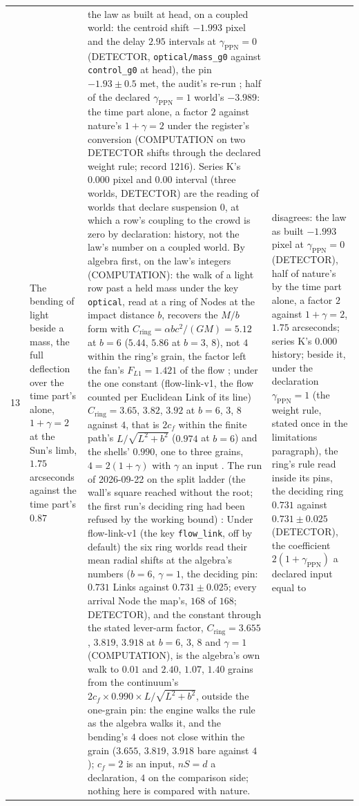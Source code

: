 {\begin{longtable}{L{0.3in}L{2.0in}L{1.5in}L{2.2in}}
13 & The bending of light beside a mass, the full deflection over the time part's alone, $1 + \gamma = 2$ at the Sun's limb, $1.75$ arcseconds against the time part's $0.87$ \cite{dyson1920} & the law as built at head, on a coupled world: the centroid shift $-1.993$ pixel and the delay $2.95$ intervals at $\gamma_{\mathrm{PPN}} = 0$ (DETECTOR, \texttt{optical/mass\_g0} against \texttt{control\_g0} at head), the pin $-1.93 \pm 0.5$ met, the audit's re-run \cite{disagrees}; half of the declared $\gamma_{\mathrm{PPN}} = 1$ world's $-3.989$: the time part alone, a factor $2$ against nature's $1 + \gamma = 2$ under the register's conversion (COMPUTATION on two DETECTOR shifts through the declared weight rule; record 1216). Series K's $0.000$ pixel and $0.00$ interval (three worlds, DETECTOR) are the reading of worlds that declare suspension $0$, at which a row's coupling to the crowd is zero by declaration: history, not the law's number on a coupled world. By algebra first, on the law's integers (COMPUTATION): the walk of a light row past a held mass under the key \texttt{optical}, read at a ring of Nodes at the impact distance $b$, recovers the $M/b$ form with $C_{\mathrm{ring}} = \alpha b c^2/(GM) = 5.12$ at $b = 6$ ($5.44$, $5.86$ at $b = 3$, $8$), not $4$ within the ring's grain, the factor left the fan's $F_{L1} = 1.421$ of the flow \cite{stepalgebra}; under the one constant (flow-link-v1, the flow counted per Euclidean Link of its line) $C_{\mathrm{ring}} = 3.65$, $3.82$, $3.92$ at $b = 6$, $3$, $8$ against $4$, that is $2c_f$ within the finite path's $L/\sqrt{L^2 + b^2}$ ($0.974$ at $b = 6$) and the shells' $0.990$, one to three grains, $4 = 2(1 + \gamma)$ with $\gamma$ an input \cite{flowalgebra}. The run of 2026-09-22 on the split ladder (the wall's square reached without the root; the first run's deciding ring had been refused by the working bound) \cite{ringrun}: Under flow-link-v1 (the key \texttt{flow\_link}, off by default) the six ring worlds read their mean radial shifts at the algebra's numbers ($b = 6$, $\gamma = 1$, the deciding pin: $0.731$ Links against $0.731 \pm 0.025$; every arrival Node the map's, $168$ of $168$; DETECTOR), and the constant through the stated lever-arm factor, $C_{\mathrm{ring}} = 3.655$, $3.819$, $3.918$ at $b = 6$, $3$, $8$ and $\gamma = 1$ (COMPUTATION), is the algebra's own walk to $0.01$ and $2.40$, $1.07$, $1.40$ grains from the continuum's $2c_f \times 0.990 \times L/\sqrt{L^2 + b^2}$, outside the one-grain pin: the engine walks the rule as the algebra walks it, and the bending's $4$ does not close within the grain ($3.655$, $3.819$, $3.918$ bare against $4$); $c_f = 2$ is an input, $nS = d$ a declaration, $4$ on the comparison side; nothing here is compared with nature. & disagrees: the law as built $-1.993$ pixel at $\gamma_{\mathrm{PPN}} = 0$ (DETECTOR), half of nature's by the time part alone, a factor $2$ against $1 + \gamma = 2$, $1.75$ arcseconds; series K's $0.000$ history; beside it, under the declaration $\gamma_{\mathrm{PPN}} = 1$ (the weight rule, stated once in the limitations paragraph), the ring's rule read inside its pins, the deciding ring $0.731$ against $0.731 \pm 0.025$ (DETECTOR), the coefficient $2(1 + \gamma_{\mathrm{PPN}})$ a declared input equal to 
\end{longtable}}
